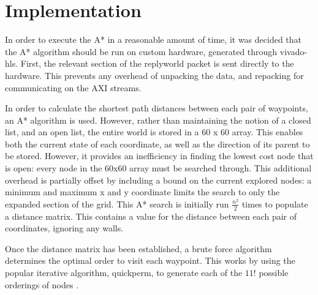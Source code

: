 \documentclass[a4paper, 11pt]{article}
\begin{document}
\section{Implementation} %
In order to execute the A* in a reasonable amount of time, it was decided that
the A* algorithm should be run on custom hardware, generated through vivado-hls. 
First, the relevant section of the replyworld packet is sent directly to the
hardware. This prevents any overhead of unpacking the data, and repacking for
communicating on the AXI streams. 
\par\bigskip\noindent
In order to calculate the shortest path distances between each pair of
waypoints, an A* algorithm is used. However, rather than maintaining the notion of a
closed list, and an open list, the entire world is stored in a 60 x 60 array.
This enables both the current state of each coordinate, as well as the direction of
its parent to be stored. However, it provides an inefficiency in finding the
lowest cost node that is open: every node in the 60x60 array must be searched
through. This additional overhead is partially offset by including a bound on 
the current explored nodes: a minimum and maximum x and y coordinate limits the
search to only the expanded section of the grid. 
This A* search is initially run $\frac{n^2}{2}$ times to populate a distance
matrix. This contains a value for the distance between each pair of
coordinates, ignoring any walls. 
\par\bigskip\noindent
Once the distance matrix has been established, a brute force algorithm
determines the optimal order to visit each waypoint. This works by using the
popular iterative algorithm, quickperm, to generate each of the $11!$ possible orderings of
nodes \cite{quickperm}. 


\end{document}
